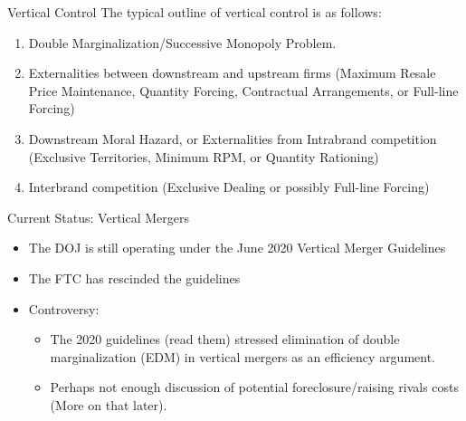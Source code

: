 \documentclass[aspectratio=169,11pt]{beamer}
\begin{document}


\begin{frame}{Vertical Control}
The typical outline of vertical control is as follows:\\
\begin{enumerate}
\item Double Marginalization/Successive Monopoly Problem.

\item Externalities between downstream and upstream firms (Maximum Resale Price Maintenance, Quantity Forcing, Contractual Arrangements, or Full-line Forcing)\\

\item Downstream Moral Hazard, or Externalities from Intrabrand competition (Exclusive Territories, Minimum RPM, or Quantity Rationing)\\

\item Interbrand competition (Exclusive Dealing or possibly Full-line Forcing)\\
\end{enumerate}
\end{frame}

\begin{frame}{Current Status: Vertical Mergers}
\begin{itemize}
\item The DOJ is still operating under the June 2020 Vertical Merger Guidelines
\item The FTC has rescinded the guidelines
\item Controversy:
\begin{itemize}
\item The 2020 guidelines (read them) stressed  \alert{elimination of double marginalization} (EDM) in vertical mergers as an \alert{efficiency} argument.
\item Perhaps not enough discussion of potential foreclosure/raising rivals costs (More on that later).
\end{itemize}
\end{itemize}
\end{frame}
\end{document}
